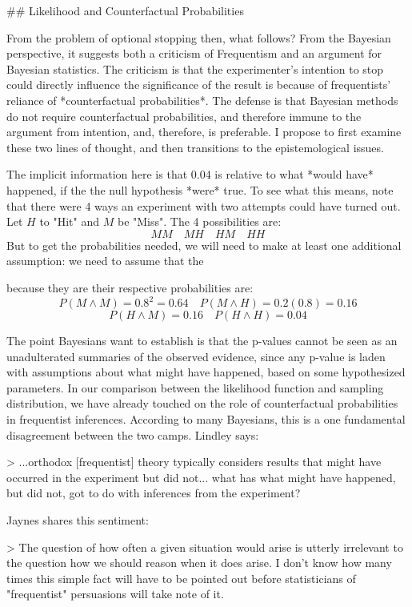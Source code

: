 \#\# Likelihood and Counterfactual Probabilities

From the problem of optional stopping then, what follows? From the
Bayesian perspective, it suggests both a criticism of Frequentism and an
argument for Bayesian statistics. The criticism is that the
experimenter's intention to stop could directly influence the
significance of the result is because of frequentists' reliance of
*counterfactual probabilities*. The defense is that Bayesian methods do
not require counterfactual probabilities, and therefore immune to the
argument from intention, and, therefore, is preferable. I propose to
first examine these two lines of thought, and then transitions to the
epistemological issues.

The implicit information here is that \(0.04\) is relative to what
*would have* happened, if the the null hypothesis *were* true. To see
what this means, note that there were 4 ways an experiment with two
attempts could have turned out. Let \(H\) to "Hit" and \(M\) be "Miss".
The 4 possibilities are: \[MM \quad MH \quad HM \quad HH\] But to get
the probabilities needed, we will need to make at least one additional
assumption: we need to assume that the

because they are their respective probabilities are:
\[P(M\wedge M)=0.8^2=0.64 \quad P(M\wedge H)=0.2(0.8)=0.16\]
\[P(H \wedge M)=0.16 \quad P(H \wedge H)=0.04\]

The point Bayesians want to establish is that the p-values cannot be
seen as an unadulterated summaries of the observed evidence, since any
p-value is laden with assumptions about what might have happened, based
on some hypothesized parameters. In our comparison between the
likelihood function and sampling distribution, we have already touched
on the role of counterfactual probabilities in frequentist inferences.
According to many Bayesians, this is a one fundamental disagreement
between the two camps. Lindley says:

\textgreater{} ...orthodox {[}frequentist{]} theory typically considers
results that might have occurred in the experiment but did not... what
has what might have happened, but did not, got to do with inferences
from the experiment?

Jaynes shares this sentiment:

\textgreater{} The question of how often a given situation would arise
is utterly irrelevant to the question how we should reason when it does
arise. I don't know how many times this simple fact will have to be
pointed out before statisticians of "frequentist" persuasions will take
note of it.

